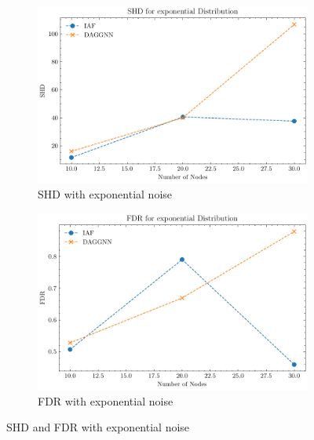 \documentclass[10pt]{article}
\begin{document}
\begin{figure}[H]
    \centering
    \begin{subfigure}{0.45\textwidth}
        \includegraphics[width=\textwidth]{fig/SHD_independence_exponential.pdf}
        \caption{SHD with exponential noise}
        \label{SHD_exponential}
    \end{subfigure}
    \hfill
    \begin{subfigure}{0.45\textwidth}
        \includegraphics[width=\textwidth]{fig/FDR_independence_exponential.pdf}
        \caption{FDR with exponential noise}
        \label{FDR_exponential}
    \end{subfigure}
    \caption{SHD and FDR with exponential noise}
    \label{SHD_FDR_exponential}
\end{figure}
\end{document}
